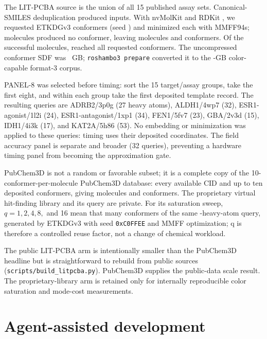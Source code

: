 The LIT-PCBA source is the union of all 15 published assay sets. Canonical-SMILES
deduplication produced \LitpcbaSourceCompounds{} inputs. With nvMolKit \LitpcbaNvmolkitVersion{} and RDKit \LitpcbaRdkitVersion{},
we requested \LitpcbaConformersRequested{} ETKDGv3 conformers (seed \LitpcbaConformerSeed{}) and minimized each with MMFF94s;
\LitpcbaCompoundsWithoutConformers{} molecules produced no conformer, leaving \LitpcbaCorpusMolecules{} molecules
and \LitpcbaCorpusConformers{} conformers. Of the successful molecules, \LitpcbaFullConformerMolecules{}
reached all \LitpcbaConformersRequested{} requested conformers. The uncompressed conformer SDF was \LitpcbaSourceSdfGigabytes~GB;
\texttt{roshambo3 prepare} converted it to the
\LitpcbaDiskGigabytes-GB color-capable format-3 corpus.

PANEL-8 was selected before timing: sort the 15 target/assay groups, take the
first eight, and within each group take the first deposited template record.
The resulting queries are ADRB2/3p0g (27 heavy atoms), ALDH1/4wp7 (32),
ESR1-agonist/1l2i (24), ESR1-antagonist/1xp1 (34), FEN1/5fv7 (23), GBA/2v3d
(15), IDH1/4i3k (17), and KAT2A/5h86 (53). No embedding or minimization was
applied to these queries: timing uses their deposited coordinates. The field
accuracy panel is separate and broader (32 queries), preventing a hardware
timing panel from becoming the approximation gate.

PubChem3D is not a random or favorable subset; it is a complete copy of the 10-conformer-per-molecule PubChem3D
database: every available CID and up to ten deposited
conformers, giving \DfiveMolecules{} molecules and \DfiveConformers{}
conformers. The proprietary
virtual hit-finding library and its query are private. For its saturation sweep,
$q=1, 2, 4, 8,$ and 16 mean that
many conformers of the same \ThreeCrQueryHeavyAtoms-heavy-atom query, generated
by ETKDGv3 with seed \texttt{0xC0FFEE} and MMFF optimization; q is therefore a
controlled reuse factor, not a change of chemical workload.



The public LIT-PCBA arm is intentionally smaller than the PubChem3D headline but is
straightforward to rebuild from public sources
(\texttt{scripts/build\_litpcba.py}). PubChem3D supplies the public-data scale
result. The proprietary-library arm is retained only
for internally reproducible color saturation and mode-cost measurements.

\section{Agent-assisted development}
\label{app:agents}

